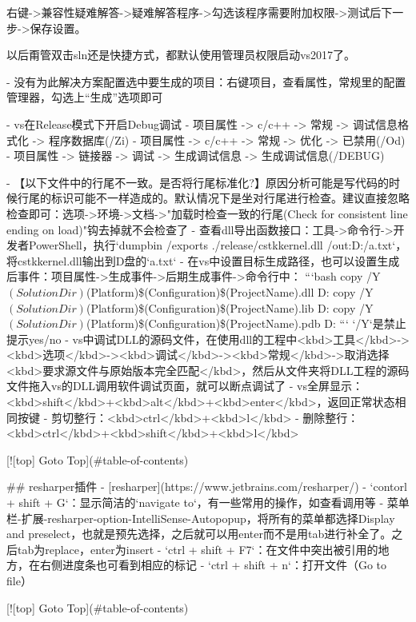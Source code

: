 右键->兼容性疑难解答->疑难解答程序->勾选该程序需要附加权限->测试后下一步->保存设置。

以后甭管双击sln还是快捷方式，都默认使用管理员权限启动vs2017了。

- 没有为此解决方案配置选中要生成的项目：右键项目，查看属性，常规里的配置管理器，勾选上“生成”选项即可

- vs在Release模式下开启Debug调试
  - 项目属性 -> c/c++ -> 常规 -> 调试信息格式化 -> 程序数据库(/Zi)
  - 项目属性 -> c/c++ -> 常规 -> 优化 -> 已禁用(/Od)
  - 项目属性 -> 链接器 -> 调试 -> 生成调试信息 -> 生成调试信息(/DEBUG)

- 【以下文件中的行尾不一致。是否将行尾标准化?】原因分析可能是写代码的时候行尾的标识可能不一样造成的。默认情况下是坐对行尾进行检查。建议直接忽略检查即可：选项->环境->文档->"加载时检查一致的行尾(Check for consistent line ending on load)"钩去掉就不会检查了
- 查看dll导出函数接口：工具->命令行->开发者PowerShell，执行`dumpbin /exports ./release/cstkkernel.dll /out:D:/a.txt`，将cstkkernel.dll输出到D盘的`a.txt`
- 在vs中设置目标生成路径，也可以设置生成后事件：项目属性->生成事件->后期生成事件->命令行中：
  ```bash
  copy /Y $(SolutionDir)$(Platform)\$(Configuration)\$(ProjectName).dll D:\myDev\TZSatelliteSimTool\release
  copy /Y $(SolutionDir)$(Platform)\$(Configuration)\$(ProjectName).lib D:\myDev\TZSatelliteSimTool\release
  copy /Y $(SolutionDir)$(Platform)\$(Configuration)\$(ProjectName).pdb D:\myDev\TZSatelliteSimTool\release
  ```
  `/Y`是禁止提示yes/no
- vs中调试DLL的源码文件，在使用dll的工程中<kbd>工具</kbd>-><kbd>选项</kbd>-><kbd>调试</kbd>-><kbd>常规</kbd>->取消选择<kbd>要求源文件与原始版本完全匹配</kbd>，然后从文件夹将DLL工程的源码文件拖入vs的DLL调用软件调试页面，就可以断点调试了
- vs全屏显示：<kbd>shift</kbd>+<kbd>alt</kbd>+<kbd>enter</kbd>，返回正常状态相同按键
- 剪切整行：<kbd>ctrl</kbd>+<kbd>l</kbd>
- 删除整行：<kbd>ctrl</kbd>+<kbd>shift</kbd>+<kbd>l</kbd>

[![top] Goto Top](#table-of-contents)

## resharper插件
- [resharper](https://www.jetbrains.com/resharper/)
- `contorl + shift + G`：显示简洁的`navigate to`，有一些常用的操作，如查看调用等
- 菜单栏-扩展-resharper-option-IntelliSense-Autopopup，将所有的菜单都选择Display and preselect，也就是预先选择，之后就可以用enter而不是用tab进行补全了。之后tab为replace，enter为insert
- `ctrl + shift + F7`：在文件中突出被引用的地方，在右侧进度条也可看到相应的标记
- `ctrl + shift + n`：打开文件（Go to file）


[![top] Goto Top](#table-of-contents)


